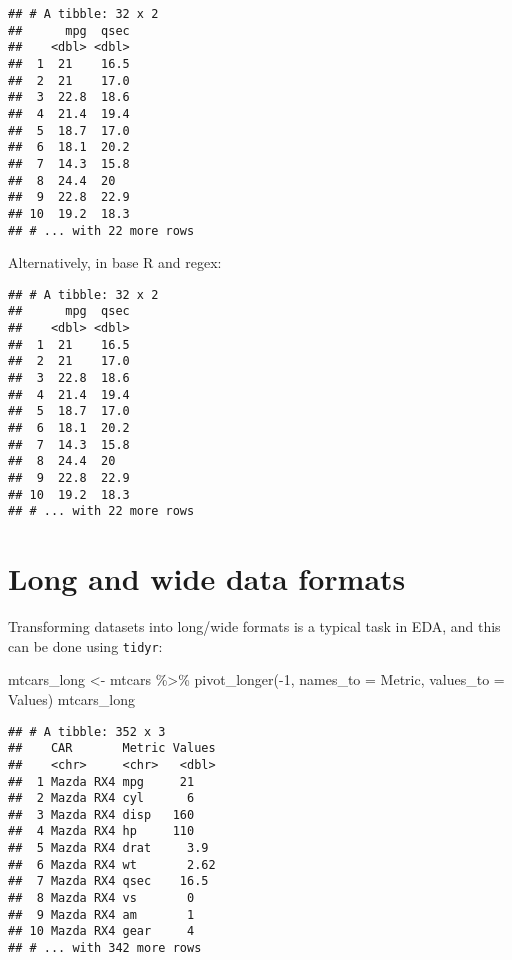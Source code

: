 \documentclass[
]{book}
\newenvironment{Shaded}{\begin{snugshade}}{\end{snugshade}}
\newcommand{\AttributeTok}[1]{\textcolor[rgb]{0.77,0.63,0.00}{#1}}
\newcommand{\DecValTok}[1]{\textcolor[rgb]{0.00,0.00,0.81}{#1}}
\newcommand{\FunctionTok}[1]{\textcolor[rgb]{0.00,0.00,0.00}{#1}}
\newcommand{\NormalTok}[1]{#1}
\newcommand{\OtherTok}[1]{\textcolor[rgb]{0.56,0.35,0.01}{#1}}
\newcommand{\SpecialCharTok}[1]{\textcolor[rgb]{0.00,0.00,0.00}{#1}}
\newcommand{\StringTok}[1]{\textcolor[rgb]{0.31,0.60,0.02}{#1}}
\begin{document}
\begin{verbatim}
## # A tibble: 32 x 2
##      mpg  qsec
##    <dbl> <dbl>
##  1  21    16.5
##  2  21    17.0
##  3  22.8  18.6
##  4  21.4  19.4
##  5  18.7  17.0
##  6  18.1  20.2
##  7  14.3  15.8
##  8  24.4  20  
##  9  22.8  22.9
## 10  19.2  18.3
## # ... with 22 more rows
\end{verbatim}

Alternatively, in base R and regex:

\begin{Shaded}
\end{Shaded}

\begin{verbatim}
## # A tibble: 32 x 2
##      mpg  qsec
##    <dbl> <dbl>
##  1  21    16.5
##  2  21    17.0
##  3  22.8  18.6
##  4  21.4  19.4
##  5  18.7  17.0
##  6  18.1  20.2
##  7  14.3  15.8
##  8  24.4  20  
##  9  22.8  22.9
## 10  19.2  18.3
## # ... with 22 more rows
\end{verbatim}

\hypertarget{long-and-wide-data-formats}{%
\section{Long and wide data formats}\label{long-and-wide-data-formats}}

Transforming datasets into long/wide formats is a typical task in EDA, and this can be done using \texttt{tidyr}:

\begin{Shaded}
\begin{Highlighting}[]
\NormalTok{mtcars\_long }\OtherTok{\textless{}{-}}\NormalTok{ mtcars }\SpecialCharTok{\%\textgreater{}\%} \FunctionTok{pivot\_longer}\NormalTok{(}\SpecialCharTok{{-}}\DecValTok{1}\NormalTok{, }\AttributeTok{names\_to =} \StringTok{\textquotesingle{}Metric\textquotesingle{}}\NormalTok{, }\AttributeTok{values\_to =} \StringTok{\textquotesingle{}Values\textquotesingle{}}\NormalTok{)}
\NormalTok{mtcars\_long}
\end{Highlighting}
\end{Shaded}

\begin{verbatim}
## # A tibble: 352 x 3
##    CAR       Metric Values
##    <chr>     <chr>   <dbl>
##  1 Mazda RX4 mpg     21   
##  2 Mazda RX4 cyl      6   
##  3 Mazda RX4 disp   160   
##  4 Mazda RX4 hp     110   
##  5 Mazda RX4 drat     3.9 
##  6 Mazda RX4 wt       2.62
##  7 Mazda RX4 qsec    16.5 
##  8 Mazda RX4 vs       0   
##  9 Mazda RX4 am       1   
## 10 Mazda RX4 gear     4   
## # ... with 342 more rows
\end{verbatim}
\end{document}
